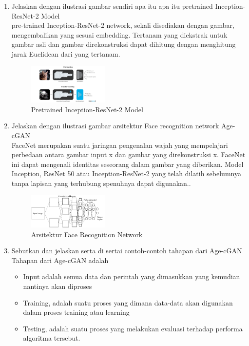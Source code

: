\begin{enumerate}
\item Jelaskan dengan ilustrasi gambar sendiri apa itu apa itu pretrained Inception-ResNet-2 Model\\
pre-trained Inception-ResNet-2 network, sekali disediakan dengan gambar, mengembalikan yang sesuai embedding. Tertanam yang diekstrak untuk gambar asli dan gambar direkonstruksi dapat dihitung dengan menghitung jarak Euclidean dari yang tertanam.

\begin{figure}[H]
\includegraphics[width=4cm]{figures/1174002/9/5.png}
\centering
\caption{Pretrained Inception-ResNet-2 Model}
\end{figure}

\item Jelaskan dengan ilustrasi gambar arsitektur Face recognition network
Age-cGAN\\
FaceNet merupakan suatu jaringan pengenalan wajah yang mempelajari perbedaan antara gambar input x dan gambar yang direkonstruksi x. FaceNet ini dapat mengenali identitas seseorang dalam gambar yang diberikan. Model Inception, ResNet 50 atau Inception-ResNet-2 yang telah dilatih sebelumnya tanpa lapisan yang terhubung spenuhnya dapat digunakan..

\begin{figure}[H]
\includegraphics[width=4cm]{figures/1174002/9/6.png}
\centering
\caption{Arsitektur Face Recognition Network}
\end{figure}

\item Sebutkan dan jelaskan serta di sertai contoh-contoh tahapan dari Age-cGAN\\
Tahapan dari Age-cGAN adalah
\begin{itemize}
\item Input adalah semua data dan perintah yang dimasukkan yang kemudian nantinya akan diproses
\item Training, adalah suatu proses yang dimana data-data akan digunakan dalam proses training atau learning
\item Testing, adalah suatu proses yang melakukan evaluasi terhadap performa algoritma tersebut.
\end{itemize}


\end{enumerate}
